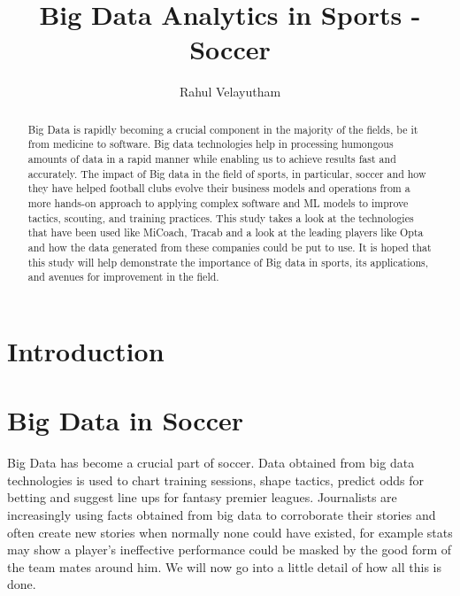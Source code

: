 \documentclass[sigconf]{acmart}
\begin{document}
\title{Big Data Analytics in Sports - Soccer}


\author{Rahul Velayutham}

\renewcommand{\shortauthors}{}


\begin{abstract}
Big Data is rapidly becoming a crucial component in the majority of the fields, be it from medicine to software. Big data technologies help in processing humongous amounts of data in a rapid manner while enabling us to achieve results fast and accurately. The impact of Big data in the field of sports, in particular, soccer and how they have helped football clubs evolve their business models and operations from a more hands-on approach to applying complex software and ML models to improve tactics, scouting, and training practices. This study takes a look at the technologies that have been used like MiCoach, Tracab and a look at the leading players like Opta and how the data generated from these companies could be put to use. It is hoped that this study will help demonstrate the importance of Big data in sports, its applications, and avenues for improvement in the field.
\end{abstract}


\maketitle

\section{Introduction}


\section{Big Data in Soccer}

Big Data has become a crucial part of soccer. Data obtained from big data technologies is used to chart training sessions, shape tactics, predict odds for betting and suggest line ups for fantasy premier leagues. Journalists are increasingly using facts obtained from big data to corroborate their stories and often create new stories when normally none could have existed, for example stats may show a player’s ineffective performance could be masked by the good form of the team mates around him. We will now go into a little detail of how all this is done.
\end{document}
